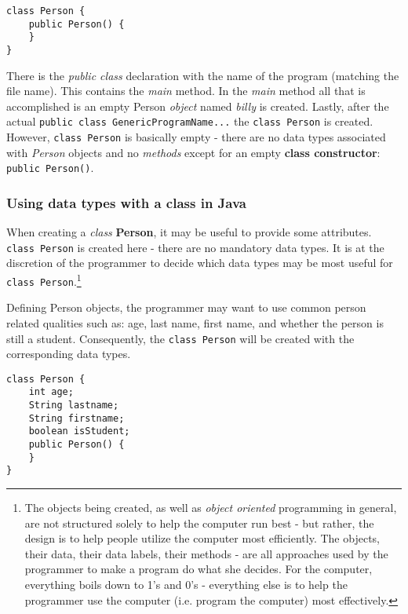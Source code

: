 \documentclass{article}
\begin{document}
\begin{flushleft}
\begin{verbatim}
class Person {
    public Person() {
    }
}

\end{verbatim}

There is the \emph{public class} declaration with the name of the program (matching the file name). This contains the \emph{main} method. In the \emph{main} method all that is accomplished is an empty Person \emph{object} named \textit{billy} is created. Lastly, after the actual  \texttt{public class GenericProgramName{...}} the \texttt{class Person} is created. However, \texttt{class Person} is basically empty - there are no data types associated with \emph{Person} objects and  no \emph{methods}  except for an empty \textbf{class constructor}: \texttt{public Person(){}}. \par

\subsubsection{Using data types with a class in Java}
When creating a \emph{class} \textbf{Person}, it may be useful to provide some attributes. \texttt{class Person} is created here - there are no mandatory data types. It is at the discretion of the programmer to decide which data types may be most useful for \texttt{class Person}.\footnote{The objects being created, as well as \emph{object oriented} programming in general, are not structured solely to help the computer run best - but rather, the design is to help people utilize the computer most efficiently. The objects, their data, their data labels, their methods - are all approaches used by the programmer to make a program do what she decides. For the computer, everything boils down to 1's and 0's - everything else is to help the programmer use the computer (i.e. program the computer) most effectively.}\par
Defining Person objects, the programmer may want to use common person related qualities such as: age, last name, first name, and whether the person is still a student. Consequently, the \texttt{class Person} will be created with the corresponding data types.

\label{code:mostbasicdatatypes}
\begin{verbatim}
class Person {
    int age; 
    String lastname;
    String firstname;
    boolean isStudent;
    public Person() {
    }
}
\end{verbatim}


\end{flushleft}
\end{document}
